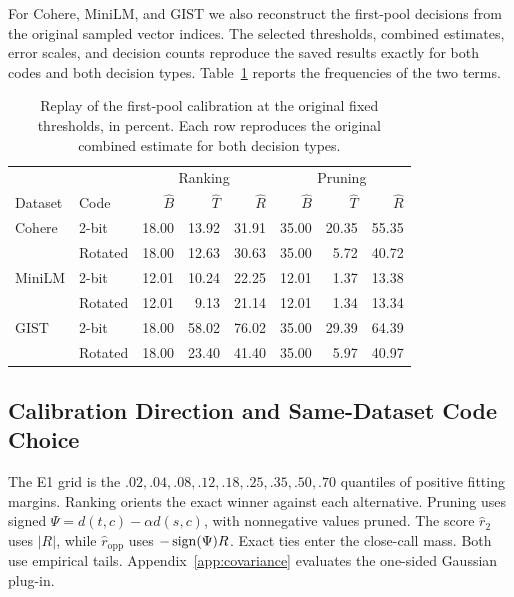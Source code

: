 For Cohere, MiniLM, and GIST we also reconstruct the first-pool decisions from the original sampled vector indices. The selected thresholds, combined estimates, error scales, and decision counts reproduce the saved results exactly for both codes and both decision types. Table~\ref{tab:app-calibration-components} reports the frequencies of the two terms.

\begin{table}[tbp]
\centering


\small
\begin{tabular}{llrrrrrr}
\toprule
& & \multicolumn{3}{c}{Ranking} & \multicolumn{3}{c}{Pruning} \\
Dataset & Code & $\widehat B$ & $\widehat T$ & $\widehat R$ & $\widehat B$ & $\widehat T$ & $\widehat R$ \\
\midrule
Cohere & 2-bit & 18.00 & 13.92 & 31.91 & 35.00 & 20.35 & 55.35 \\
 & Rotated & 18.00 & 12.63 & 30.63 & 35.00 & 5.72 & 40.72 \\
MiniLM & 2-bit & 12.01 & 10.24 & 22.25 & 12.01 & 1.37 & 13.38 \\
 & Rotated & 12.01 & 9.13 & 21.14 & 12.01 & 1.34 & 13.34 \\
GIST & 2-bit & 18.00 & 58.02 & 76.02 & 35.00 & 29.39 & 64.39 \\
 & Rotated & 18.00 & 23.40 & 41.40 & 35.00 & 5.97 & 40.97 \\
\bottomrule
\end{tabular}

\small
\caption{Replay of the first-pool calibration at the original fixed thresholds, in percent. Each row reproduces the original combined estimate for both decision types.}
\label{tab:app-calibration-components}
\end{table}

\subsection{Calibration Direction and Same-Dataset Code Choice}
\label{app:calibration-direction}

The E1 grid is the $.02,.04,.08,.12,.18,.25,.35,.50,.70$ quantiles of positive fitting margins. Ranking orients the exact winner against each alternative. Pruning uses signed $\Psi=d(t,c)-\alpha d(s,c)$, with nonnegative values pruned. The score $\widehat r_2$ uses $|R|$, while $\widehat r_{\mathrm{opp}}$ uses $-\operatorname{sign}(\Psi)R$. Exact ties enter the close-call mass. Both use empirical tails. Appendix~\ref{app:covariance} evaluates the one-sided Gaussian plug-in.

